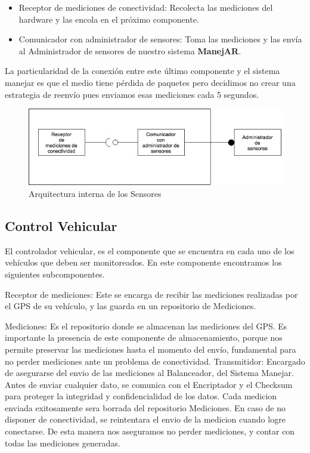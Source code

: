 \begin{itemize}
  \item Receptor de mediciones de conectividad: Recolecta las mediciones del 
  hardware y las encola en el próximo componente.
  
  \item Comunicador con administrador de sensores: Toma las mediciones y las 
  envía al Administrador de sensores de nuestro sistema \textbf{ManejAR}.
\end{itemize}



La particularidad de la conexión entre este último componente y el sistema 
manejar es que el medio tiene pérdida de paquetes pero decidimos no crear una 
estrategia de reenvío pues enviamos esas mediciones cada 5 segundos.


\begin{figure}
\centerline{\includegraphics[width=1\textwidth]{./imagenes/arquitectura_tp2/sensor.png}}
\caption{Arquitectura interna de los Sensores}
\end{figure}

\subsection{Control Vehicular}
El controlador vehicular, es el componente que se encuentra en cada uno de los vehículos que deben
ser monitoreados. En este componente encontramos los siguientes subcomponentes.

Receptor de mediciones: Este se encarga de recibir las mediciones realizadas por el GPS de su vehículo,
 y las guarda en un repositorio de Mediciones.
 
Mediciones: Es el repositorio donde se almacenan las mediciones del GPS.
 Es importante la presencia de este componente de almacenamiento, porque nos permite preservar
las mediciones hasta el momento del envío, fundamental para no perder mediciones ante un
 problema de conectividad.
Transmitidor: Encargado de asegurarse del envio de las mediciones al Balanceador, del Sistema Manejar.
Antes de enviar cualquier dato, se comunica con el Encriptador y el Checksum para proteger la
integridad y confidencialidad de los datos. Cada medicion enviada exitosamente sera borrada del
repositorio Mediciones. En caso de no disponer de conectividad, se reintentara el envio de la medicion
cuando logre conectarse. De esta manera nos aseguramos no perder mediciones, y
 contar con todas las mediciones generadas.

